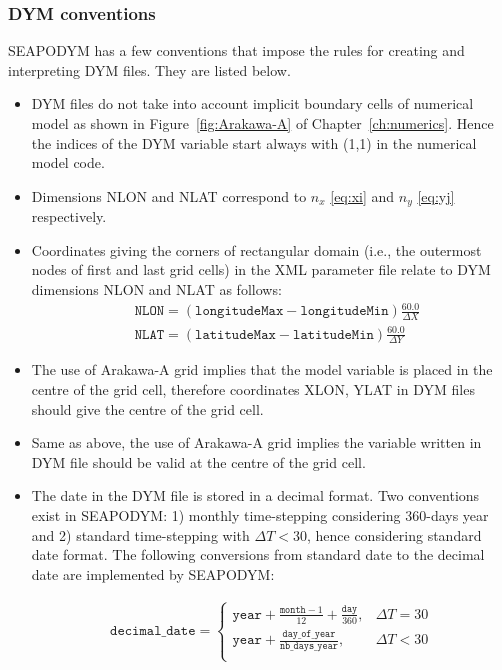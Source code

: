 \subsubsection{DYM conventions}

SEAPODYM has a few conventions that impose the rules for creating and interpreting DYM files. They are listed below.
\begin{itemize}
\item DYM files do not take into account implicit boundary cells of numerical model as shown in Figure~\ref{fig:Arakawa-A} of Chapter~\ref{ch:numerics}. Hence the indices of the DYM variable start always with (1,1) in the numerical model code.
\item Dimensions {\ttfamily NLON} and {\ttfamily NLAT} correspond to $n_x$ \eqref{eq:xi} and $n_y$ \eqref{eq:yj} respectively.  
\item Coordinates giving the corners of rectangular domain (i.e., the outermost nodes of first and last grid cells) in the XML parameter file relate to DYM dimensions {\ttfamily NLON} and {\ttfamily NLAT} as follows:\\

\begin{align}
& \texttt{NLON} = \left(\texttt{longitudeMax}-\texttt{longitudeMin}\right)\frac{60.0}{\Delta X} \\
& \texttt{NLAT} = \left(\texttt{latitudeMax}-\texttt{latitudeMin}\right)\frac{60.0}{\Delta Y} 
\end{align}

\item The use of Arakawa-A grid implies that the model variable is placed in the centre of the grid cell, therefore coordinates {\ttfamily XLON}, {\ttfamily YLAT} in DYM files should give the centre of the grid cell. 
\item Same as above, the use of Arakawa-A grid implies the variable written in DYM file should be valid at the centre of the grid cell. 
\item The date in the DYM file is stored in a decimal format. Two conventions exist in SEAPODYM: 1) monthly time-stepping considering 360-days year and 2) standard time-stepping with $\Delta T<30$, hence considering standard date format. The following conversions from standard date to the decimal date are implemented by SEAPODYM: 

\begin{eqnarray}
  \label{eq:decimal-date}
  \texttt{decimal\_date} = 
  \left\{\begin{array}{ll}
      \texttt{year} + \frac{\texttt{month}-1}{12} + \frac{\texttt{day}}{360},  & \Delta T=30 \\
      \texttt{year} + \frac{\texttt{day\_of\_year}}{\texttt{nb\_days\_year}},  & \Delta T<30 \\
  \end{array}\right.
\end{eqnarray}	 
 

\end{itemize}
